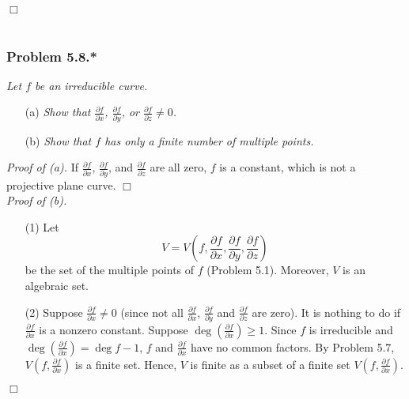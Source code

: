 \documentclass{article}
\begin{document}
$\Box$ \\\\






\subsubsection*{Problem 5.8.*}
\emph{Let $f$ be an irreducible curve.}
\begin{enumerate}
\item[(a)]
  \emph{Show that
  $\frac{\partial f}{\partial x}$,
  $\frac{\partial f}{\partial y}$,
  or $\frac{\partial f}{\partial z} \neq 0$.}

\item[(b)]
  \emph{Show that $f$ has only a finite number of multiple points.} \\
\end{enumerate}



\emph{Proof of (a).}
  If $\frac{\partial f}{\partial x}$,
  $\frac{\partial f}{\partial y}$,
  and $\frac{\partial f}{\partial z}$ are all zero,
  $f$ is a constant, which is not a projective plane curve.
$\Box$ \\



\emph{Proof of (b).}
\begin{enumerate}
\item[(1)]
  Let
  \[
    V
    = V\left(
      f,
      \frac{\partial f}{\partial x},
      \frac{\partial f}{\partial y},
      \frac{\partial f}{\partial z}
    \right)
  \]
  be the set of the multiple points of $f$ (Problem 5.1).
  Moreover, $V$ is an algebraic set.

\item[(2)]
  Suppose $\frac{\partial f}{\partial x} \neq 0$
  (since not all $\frac{\partial f}{\partial x}$,
  $\frac{\partial f}{\partial y}$ and
  $\frac{\partial f}{\partial z}$ are zero).
  It is nothing to do if $\frac{\partial f}{\partial x}$ is a nonzero constant.
  Suppose $\deg\left( \frac{\partial f}{\partial x} \right) \geq 1$.
  Since $f$ is irreducible and $\deg\left( \frac{\partial f}{\partial x} \right) = \deg f - 1$,
  $f$ and $\frac{\partial f}{\partial x}$ have no common factors.
  By Problem 5.7,
  $V\left( f, \frac{\partial f}{\partial x} \right)$ is a finite set.
  Hence,
  $V$ is finite
  as a subset of a finite set $V\left( f, \frac{\partial f}{\partial x} \right)$.
\end{enumerate}
$\Box$ \\\\
\end{document}
